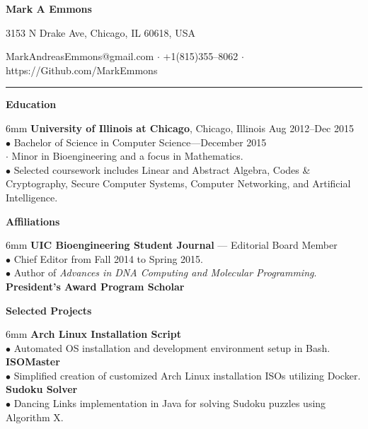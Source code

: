 \documentclass[11pt]{article}
\newcommand{\sectionheader}[1]{\noindent \textbf{\large #1}}
\newenvironment{sectionbody}{\begin{adjustwidth}{6mm}{}}{\end{adjustwidth}}
\begin{document}

\centerline{\LARGE \bf Mark A Emmons}
\centerline{3153 N Drake Ave, Chicago, IL 60618, USA}
\centerline{MarkAndreasEmmons@gmail.com $\cdot$ +1(815)355--8062 $\cdot$ https://Github.com/MarkEmmons}

\noindent\rule{16.5cm}{0.4pt}

\sectionheader{Education}
\begin{sectionbody}
{\bf University of Illinois at Chicago}, Chicago, Illinois \hfill Aug 2012--Dec 2015 \\
$\bullet$ Bachelor of Science in Computer Science---December 2015 \\
\indent $\cdot$ Minor in Bioengineering and a focus in Mathematics. \\
$\bullet$ Selected coursework includes Linear and Abstract Algebra, Codes \& Cryptography, Secure Computer Systems, Computer Networking, and Artificial Intelligence.
\end{sectionbody}

\vspace{2mm}

\sectionheader{Affiliations}
\begin{sectionbody}
{\bf UIC Bioengineering Student Journal} --- Editorial Board Member \\
$\bullet$ Chief Editor from Fall 2014 to Spring 2015. \\
$\bullet$ Author of {\it Advances in DNA Computing and Molecular Programming}. \\
{\bf President's Award Program Scholar}
\end{sectionbody}

\vspace{2mm}

\sectionheader{Selected Projects}
\begin{sectionbody}
{\bf Arch Linux Installation Script} \\
$\bullet$ Automated OS installation and development environment setup in Bash. \\
{\bf ISOMaster} \\
$\bullet$ Simplified creation of customized Arch Linux installation ISOs utilizing Docker. \\
{\bf Sudoku Solver} \\
$\bullet$ Dancing Links implementation in Java for solving Sudoku puzzles using Algorithm X.
\end{sectionbody}
\end{document}

